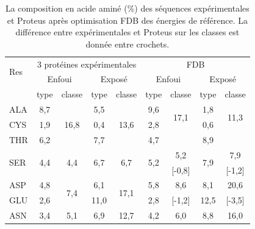    \begin{table}[!htbp]
     \centering
\caption{La composition en acide aminé (\%) des séquences expérimentales et Proteus après optimisation FDB des énergies de référence. La différence entre expérimentales et Proteus sur les classes est donnée entre crochets.}
\begin{tabular}{l|cccc|cccc}
\hline
\multirow{2}{*}{Res} & \multicolumn{4}{c|}{3 protéines expérimentales} & \multicolumn{4}{c}{FDB}\\
 & \multicolumn{2}{c}{Enfoui} & \multicolumn{2}{c|}{Exposé} & \multicolumn{2}{c}{Enfoui} & \multicolumn{2}{c}{Exposé} \\
\hline
 & type & classe & type & classe & type & classe & type & classe \\
\hline 
ALA                  & 8,7                  &  \multirow{3}{*}{16,8} & 5,5                  & \multirow{3}{*}{13,6}   &   9,6                & \multirow{2}{*}{17,1}    & 1,8 & \multirow{2}{*}{11,3} \\
CYS                  & 1,9                  &                        & 0,4                  &                         &    2,8               & \multirow{2}{*}{[-0,3]}  & 0,6 & \multirow{2}{*}{[2,3]} \\
THR                  & 6,2                  &                        & 7,7                  &                         &    4,7               &                          & 8,9 &                       \\
\hline
\multirow{2}{*}{SER} & \multirow{2}{*}{4,4} & \multirow{2}{*}{4,4}   & \multirow{2}{*}{6,7} & \multirow{2}{*}{6,7}    & \multirow{2}{*}{5,2} & 5,2                      & \multirow{2}{*}{7,9} & 7,9\\
                     &                      &                        &                      &                         &                      &  [-0,8]                  &                      & [-1,2] \\
\hline
ASP                  & 4,8                  & \multirow{2}{*}{7,4}   & 6,1                  & \multirow{2}{*}{17,1}   &   5,8                &  8,6                     & 8,1    & 20,6  \\
GLU                  & 2,6                  &                        & 11,0                 &                         &   2,8                &  [-1,2]                  & 12,5   &  [-3,5] \\
\hline
ASN                  & 3,4                  & \multirow{2}{*}{5,1}   & 6,9                  & \multirow{2}{*}{12,7}   &   4,2                &  6,0                     & 8,8 & 16,0 \\

\end{tabular}
\end{table}
